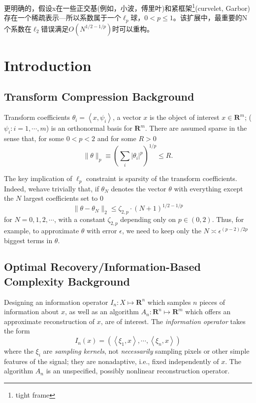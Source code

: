     更明确的，假设x在一些正交基(例如，小波，傅里叶)和紧框架\footnote{tight frame}(curvelet, Garbor)存在一个稀疏表示---所以系数属于一个$\ell_p$球，$0<p\leq 1$。该扩展中，最重要的N个系数在$\ell_2$错误满足$O(N^{1/2-1/p})$时可以重构。

\section{Introduction}
\subsection{Transform Compression Background}
\textcolor[rgb]{1,0,0}{Transform coefficients} $\theta_i = \left<x,\psi_i\right>$, a vector $x$ is the object of interest $x \in \mathbf{R}^m$; ($\psi_i: i=1, \cdots, m$) is an orthonormal basis for $\mathbf{R}^m$. There are assumed sparse in the sense that, for some $0<p<2$ and for some $R>0$
\begin{equation}
    \|\theta\|_p \equiv \left(\sum\limits_i|\theta_i|^p\right)^{1/p} \leq R.
    \label{eq3.1.1}
\end{equation}

The key implication of $\ell_p$ constraint is sparsity of the transform coefficients. Indeed, wehave trivially that, if $\theta_N$ denotes the vector $\theta$ with everything except the $N$ largest coefficients set to $0$
\begin{equation}
    \|\theta - \theta_N \|_2 \leq \zeta_{2,p} \cdot (N+1)^{1/2-1/p}
    \label{eq3.1.2}
\end{equation}
for $N = 0,1,2,\cdots$, with a constant $\zeta_{2,p}$ depending only on $p \in (0,2)$. Thus, for example, to approximate $\theta$ with error $\epsilon$, we need to keep only the $N \asymp \epsilon^{(p-2)/2p}$ biggest terms in $\theta$. 

\subsection{Optimal Recovery/Information-Based Complexity Background}
Designing an information operator $I_n:X \longmapsto \mathbf{R}^n$ which samples $n$ pieces of information about $x$, as well as an algorithm $A_n:\mathbf{R}^n \longmapsto \mathbf{R}^m$ which offers an approximate reconstruction of $x$, are of interest. The \emph{\textcolor[rgb]{1,0,0}{information operator}} takes the form  
\begin{equation*}
    I_n(x) = \left(\left<\xi_1,x\right>,\cdots,\left<\xi_n,x\right>\right)
\end{equation*}
where the $\xi_i$ are \emph{\textcolor[rgb]{1,0,0}{sampling kernels}}, not \emph{\textcolor[rgb]{0,0,1}{necessarily}} sampling pixels or other simple features of the signal; they are nonadaptive, i.e., fixed independently of $x$. The algorithm $A_n$ is an unspecified, possibly nonlinear reconstruction operator. 

